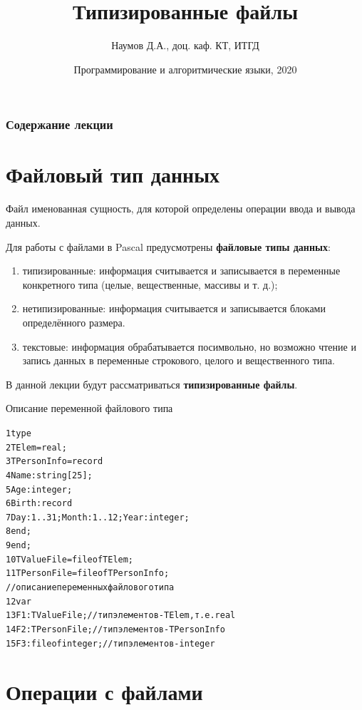 \documentclass{beamer}
\title[Типизированные файлы]{Типизированные файлы}
\author{Наумов Д.А., доц. каф. КТ, ИТГД }
\date[04.05.2020] {Программирование и алгоритмические языки, 2020}
\begin{document}
\begin{frame}
  \titlepage
\end{frame}
  
\begin{frame}
  \frametitle{Содержание лекции}
  \tableofcontents  
\end{frame}
  

\section{Файловый тип данных}

\begin{frame}
\begin{block}{Файл}
именованная сущность, для которой определены операции ввода и вывода данных.
\end{block}
Для работы с файлами в Pascal предусмотрены \textbf{файловые типы данных}:
\begin{enumerate}
\item типизированные: информация считывается и записывается в переменные конкретного типа (целые, вещественные, массивы и т. д.);
\item нетипизированные: информация считывается и записывается блоками определённого размера.
\item текстовые: информация обрабатывается посимвольно, но возможно чтение и запись данных в переменные строкового, целого и вещественного типа.
\end{enumerate}
В данной лекции будут рассматриваться \textbf{типизированные файлы}.
\end{frame} 

\begin{frame}[fragile]{Описание переменной файлового типа}
\begin{alltt}
 1 type
 2   TElem = real; 
 3   TPersonInfo = record
 4      Name: string[25];
 5      Age: integer;
 6      Birth: record
 7        Day: 1..31; Month: 1..12; Year: integer;
 8     end;
 9   end;
 10  TValueFile = file of TElem; 
 11  TPersonFile = file of TPersonInfo; 
 // описание переменных файлового типа
 12 var                  
 13   F1: TValueFile;  //тип элементов - TElem, т.е. real
 14   F2: TPersonFile; //тип элементов - TPersonInfo  
 15   F3: file of integer; //тип элементов - integer
\end{alltt}
\end{frame}

\section{Операции с файлами}
\end{document}
